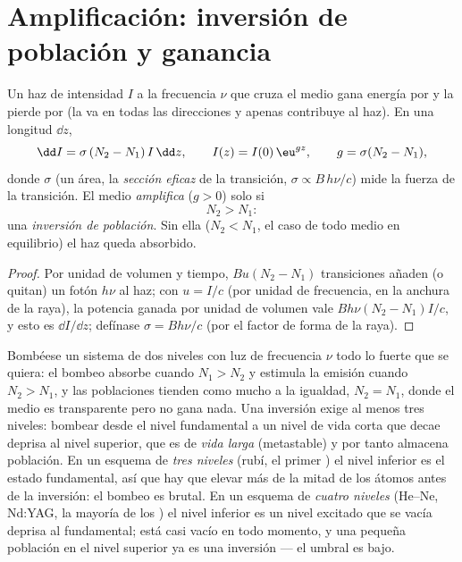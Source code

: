 \section{Amplificación: inversión de población y ganancia}

\begin{proposition}\label{prop:b2:laser:gain}
Un haz de intensidad $I$ a la frecuencia $\nu$ que cruza el medio
gana energía por  y la pierde por 
(la  va en todas las direcciones y apenas contribuye al
haz). En una longitud $\dd z$,
\[
\dd I = \sigma\,(N_2 - N_1)\,I\,\dd z, \qquad
I(z) = I(0)\,\eu^{g z}, \qquad g = \sigma(N_2 - N_1),
\]
donde $\sigma$ (un área, la \emph{sección eficaz} de la transición, $\sigma \propto B\,h\nu/c$) mide
la fuerza de la transición. El medio \emph{amplifica} ($g > 0$)
solo si
\[
N_2 > N_1 :
\]
una \emph{inversión de población}. Sin ella
($N_2 < N_1$, el caso de todo medio en equilibrio) el haz queda
absorbido.
\end{proposition}

\begin{proof}
Por unidad de volumen y tiempo, $B u (N_2 - N_1)$ transiciones añaden (o quitan)
un fotón $h\nu$ al haz; con $u = I/c$ (por unidad de frecuencia, en
la anchura de la raya), la potencia ganada por unidad de volumen vale
$B h\nu (N_2 - N_1) I/c$, y esto es $\dd I/\dd z$; defínase $\sigma =
Bh\nu/c$ (por el factor de forma de la raya).
\end{proof}

\begin{remark}\label{rem:b2:laser:twolevel}
Bombéese un sistema de dos niveles con luz de frecuencia $\nu$ todo lo fuerte que se quiera: el
bombeo absorbe cuando $N_1 > N_2$ y estimula la emisión cuando $N_2 > N_1$,
y las poblaciones tienden como mucho a la igualdad, $N_2 = N_1$, donde el
medio es transparente pero no gana nada. Una inversión exige al menos
tres niveles: bombear desde el nivel fundamental a un nivel de vida corta que
decae deprisa al nivel  superior, que es de \emph{vida larga}
(metastable) y por tanto almacena población. En un esquema de
\emph{tres niveles} (rubí, el primer
) el nivel  inferior es el estado fundamental, así que hay que elevar más de la mitad
de los átomos antes de la inversión: el bombeo es brutal. En un esquema de
\emph{cuatro niveles} (He--Ne, Nd:YAG, la mayoría
de los ) el nivel  inferior es un nivel excitado que se vacía deprisa
al fundamental; está casi vacío en todo momento, y una pequeña
población en el nivel superior ya es una inversión --- el umbral
es bajo.
\end{remark}

